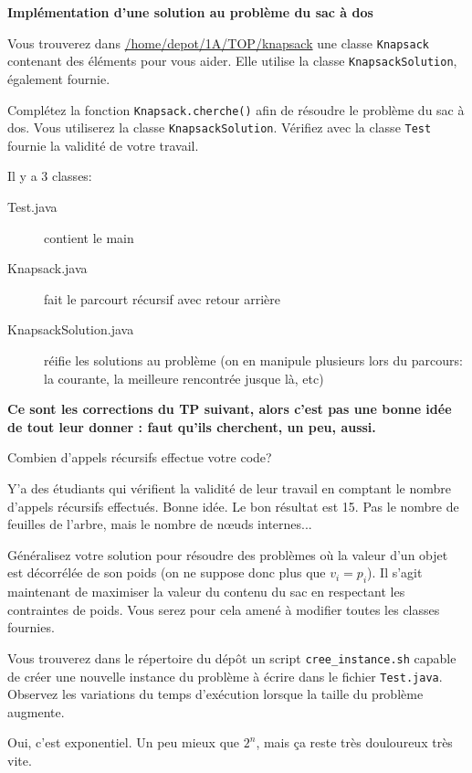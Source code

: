 \documentclass[10pt]{article}\usepackage[correction,nu]{esial}%
\begin{document}
\Exercice\textbf{Implémentation d'une solution au problème du sac à dos}

Vous trouverez dans \url{/home/depot/1A/TOP/knapsack} une classe
\texttt{Knapsack} contenant des éléments pour vous aider. Elle utilise la
classe \texttt{KnapsackSolution}, également fournie. 

\Question Complétez la fonction \texttt{Knapsack.cherche()} afin de résoudre le
problème du sac à dos. Vous utiliserez la classe \texttt{KnapsackSolution}.
Vérifiez avec la classe \texttt{Test} fournie la validité de votre travail.

\begin{Reponse}
  Il y a 3 classes:
  \begin{description}
  \item[Test.java] contient le main
  \item[Knapsack.java] fait le parcourt récursif avec retour arrière
  \item[KnapsackSolution.java] réifie les solutions au problème (on en
    manipule plusieurs lors du parcours: la courante, la meilleure
    rencontrée jusque là, etc)
  \end{description}

  \noindent\textbf{Ce sont les corrections du TP suivant, alors c'est pas une
    bonne idée de tout leur donner : faut qu'ils cherchent, un peu,
    aussi.}
    
\end{Reponse}


\Question Combien d'appels récursifs effectue votre code?

\begin{Reponse}
  Y'a des étudiants qui vérifient la validité de leur travail en comptant le
  nombre d'appels récursifs effectués. Bonne idée. Le bon résultat est 15. Pas
  le nombre de feuilles de l'arbre, mais le nombre de nœuds internes...
\end{Reponse}

\Question Généralisez votre solution pour résoudre des problèmes où la valeur
d'un objet est décorrélée de son poids (on ne suppose donc plus que $v_i=p_i$).
Il s'agit maintenant de maximiser la valeur du contenu du sac en respectant les
contraintes de poids. Vous serez pour cela amené à modifier toutes les classes
fournies.

\Question Vous trouverez dans le répertoire du dépôt un script
\texttt{cree\_instance.sh} capable de créer une nouvelle instance du problème à
écrire dans le fichier \texttt{Test.java}. Observez les variations du temps
d'exécution lorsque la taille du problème augmente.

\begin{Reponse}
  Oui, c'est exponentiel. Un peu mieux que $2^n$, mais ça reste très douloureux
  très vite.
\end{Reponse}
\end{document}
